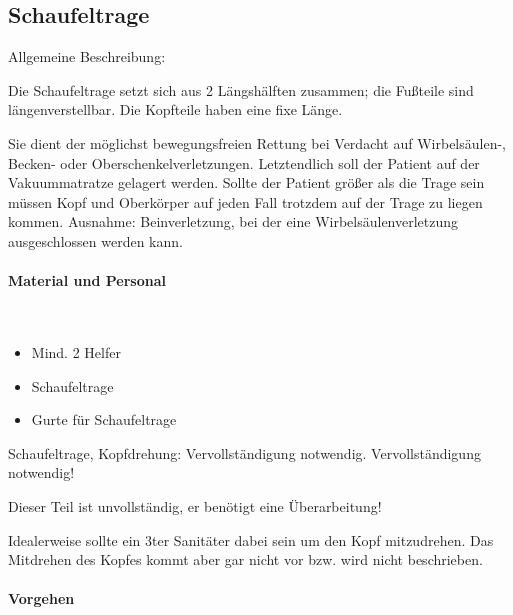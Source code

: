 \subsection{Schaufeltrage}
\label{topic:schaufeltrage-handhabung}

Allgemeine
Beschreibung: 

Die Schaufeltrage setzt sich aus 2 Längshälften zusammen;
die Fußteile sind längenverstellbar. Die Kopfteile haben eine fixe Länge.

Sie dient der möglichst bewegungsfreien Rettung bei Verdacht
auf Wirbelsäulen-, Becken- oder Oberschenkelverletzungen. Letztendlich soll
der Patient auf der Vakuummatratze gelagert werden. Sollte der Patient größer
als die Trage sein müssen Kopf und Oberkörper auf jeden Fall
trotzdem auf der Trage zu liegen kommen. Ausnahme: Beinverletzung, bei
der eine Wirbelsäulenverletzung ausgeschlossen werden kann.


\paragraph*{Material und Personal}~

\begin{itemize}
    \item Mind. 2 Helfer
    \item Schaufeltrage
    \item Gurte für Schaufeltrage
\end{itemize}


\begin{anfxwarning}[author=GABS]{Schaufeltrage, Kopfdrehung: Vervollständigung
notwendig.} Vervollständigung notwendig! \par Dieser Teil ist unvollständig, 
   er benötigt eine Überarbeitung!
   
   Idealerweise sollte ein 3ter Sanitäter dabei sein um den Kopf mitzudrehen.
   Das Mitdrehen des Kopfes kommt aber gar nicht vor bzw. wird nicht
   beschrieben. 
\end{anfxwarning}

\paragraph*{Vorgehen}~

